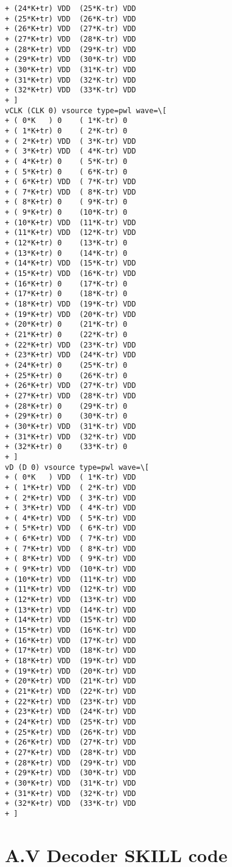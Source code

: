 \begin{lstlisting}
+ (24*K+tr) VDD  (25*K-tr) VDD
+ (25*K+tr) VDD  (26*K-tr) VDD
+ (26*K+tr) VDD  (27*K-tr) VDD
+ (27*K+tr) VDD  (28*K-tr) VDD
+ (28*K+tr) VDD  (29*K-tr) VDD
+ (29*K+tr) VDD  (30*K-tr) VDD
+ (30*K+tr) VDD  (31*K-tr) VDD
+ (31*K+tr) VDD  (32*K-tr) VDD
+ (32*K+tr) VDD  (33*K-tr) VDD
+ ]
vCLK (CLK 0) vsource type=pwl wave=\[
+ ( 0*K   ) 0    ( 1*K-tr) 0
+ ( 1*K+tr) 0    ( 2*K-tr) 0
+ ( 2*K+tr) VDD  ( 3*K-tr) VDD
+ ( 3*K+tr) VDD  ( 4*K-tr) VDD
+ ( 4*K+tr) 0    ( 5*K-tr) 0
+ ( 5*K+tr) 0    ( 6*K-tr) 0
+ ( 6*K+tr) VDD  ( 7*K-tr) VDD
+ ( 7*K+tr) VDD  ( 8*K-tr) VDD
+ ( 8*K+tr) 0    ( 9*K-tr) 0
+ ( 9*K+tr) 0    (10*K-tr) 0
+ (10*K+tr) VDD  (11*K-tr) VDD
+ (11*K+tr) VDD  (12*K-tr) VDD
+ (12*K+tr) 0    (13*K-tr) 0
+ (13*K+tr) 0    (14*K-tr) 0
+ (14*K+tr) VDD  (15*K-tr) VDD
+ (15*K+tr) VDD  (16*K-tr) VDD
+ (16*K+tr) 0    (17*K-tr) 0
+ (17*K+tr) 0    (18*K-tr) 0
+ (18*K+tr) VDD  (19*K-tr) VDD
+ (19*K+tr) VDD  (20*K-tr) VDD
+ (20*K+tr) 0    (21*K-tr) 0
+ (21*K+tr) 0    (22*K-tr) 0
+ (22*K+tr) VDD  (23*K-tr) VDD
+ (23*K+tr) VDD  (24*K-tr) VDD
+ (24*K+tr) 0    (25*K-tr) 0
+ (25*K+tr) 0    (26*K-tr) 0
+ (26*K+tr) VDD  (27*K-tr) VDD
+ (27*K+tr) VDD  (28*K-tr) VDD
+ (28*K+tr) 0    (29*K-tr) 0
+ (29*K+tr) 0    (30*K-tr) 0
+ (30*K+tr) VDD  (31*K-tr) VDD
+ (31*K+tr) VDD  (32*K-tr) VDD
+ (32*K+tr) 0    (33*K-tr) 0
+ ]
vD (D 0) vsource type=pwl wave=\[
+ ( 0*K   ) VDD  ( 1*K-tr) VDD
+ ( 1*K+tr) VDD  ( 2*K-tr) VDD
+ ( 2*K+tr) VDD  ( 3*K-tr) VDD
+ ( 3*K+tr) VDD  ( 4*K-tr) VDD
+ ( 4*K+tr) VDD  ( 5*K-tr) VDD
+ ( 5*K+tr) VDD  ( 6*K-tr) VDD
+ ( 6*K+tr) VDD  ( 7*K-tr) VDD
+ ( 7*K+tr) VDD  ( 8*K-tr) VDD
+ ( 8*K+tr) VDD  ( 9*K-tr) VDD
+ ( 9*K+tr) VDD  (10*K-tr) VDD
+ (10*K+tr) VDD  (11*K-tr) VDD
+ (11*K+tr) VDD  (12*K-tr) VDD
+ (12*K+tr) VDD  (13*K-tr) VDD
+ (13*K+tr) VDD  (14*K-tr) VDD
+ (14*K+tr) VDD  (15*K-tr) VDD
+ (15*K+tr) VDD  (16*K-tr) VDD
+ (16*K+tr) VDD  (17*K-tr) VDD
+ (17*K+tr) VDD  (18*K-tr) VDD
+ (18*K+tr) VDD  (19*K-tr) VDD
+ (19*K+tr) VDD  (20*K-tr) VDD
+ (20*K+tr) VDD  (21*K-tr) VDD
+ (21*K+tr) VDD  (22*K-tr) VDD
+ (22*K+tr) VDD  (23*K-tr) VDD
+ (23*K+tr) VDD  (24*K-tr) VDD
+ (24*K+tr) VDD  (25*K-tr) VDD
+ (25*K+tr) VDD  (26*K-tr) VDD
+ (26*K+tr) VDD  (27*K-tr) VDD
+ (27*K+tr) VDD  (28*K-tr) VDD
+ (28*K+tr) VDD  (29*K-tr) VDD
+ (29*K+tr) VDD  (30*K-tr) VDD
+ (30*K+tr) VDD  (31*K-tr) VDD
+ (31*K+tr) VDD  (32*K-tr) VDD
+ (32*K+tr) VDD  (33*K-tr) VDD
+ ]
\end{lstlisting}

\section{A.V \qquad Decoder SKILL code}

